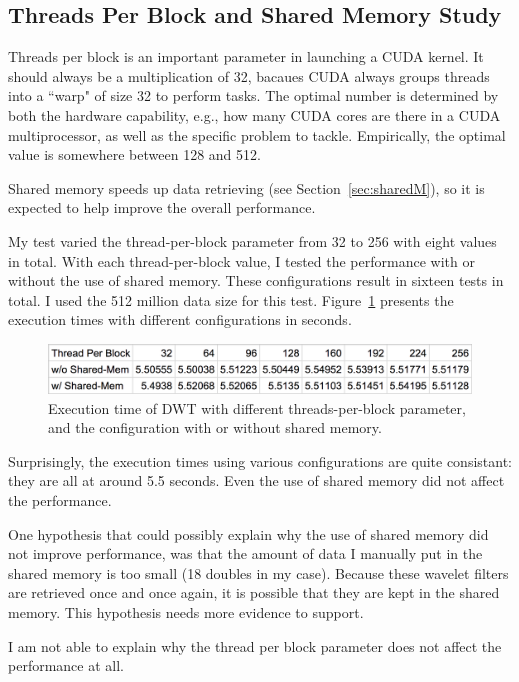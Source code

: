 \documentclass{article}
\begin{document}
\subsection{Threads Per Block and Shared Memory Study}
%
Threads per block is an important parameter in launching a CUDA kernel.
%
It should always be a multiplication of 32, bacaues CUDA always groups
threads into a ``warp" of size 32 to perform tasks.
%
The optimal number is determined by both the hardware capability, e.g., 
how many CUDA cores are there in a CUDA multiprocessor, as well as the 
specific problem to tackle. 
%
Empirically, the optimal value is somewhere between 128 and 512.

Shared memory speeds up data retrieving (see Section~\ref{sec:sharedM}),
so it is expected to help improve the overall performance.

My test varied the thread-per-block parameter from 32 to 256 with eight
values in total.
%
With each thread-per-block value, I tested the performance with or without 
the use of shared memory.
%
These configurations result in sixteen tests in total. 
%
I used the 512 million data size for this test.
%
Figure~\ref{fig:3} presents the execution times with different
configurations in seconds.


\begin{figure}
    \centering
    \includegraphics[width=1\textwidth]{3.png}
    \caption{Execution time of DWT with different threads-per-block parameter,
             and the configuration with or without shared memory.}
    \label{fig:3}
\end{figure}


Surprisingly, the execution times using various configurations are quite
consistant: they are all at around 5.5 seconds.
%
Even the use of shared memory did not affect the performance.

One hypothesis that could possibly explain why the use of shared memory
did not improve performance, was that the amount of data I manually
put in the shared memory is too small (18 doubles in my case).
%
Because these wavelet filters are retrieved once and once again,
it is possible that they are kept in the shared memory.
%
This hypothesis needs more evidence to support.

I am not able to explain why the thread per block parameter does not
affect the performance at all.
\end{document}
